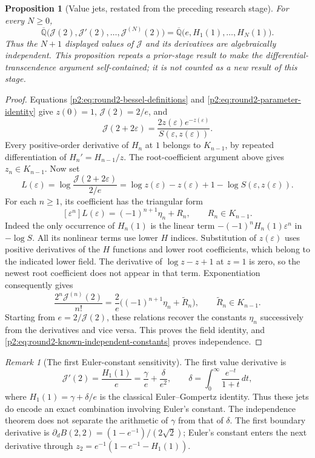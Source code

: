 \documentclass[11pt,a4paper]{article}
\newtheorem{proposition}[theorem]{Proposition}
\theoremstyle{definition}
\theoremstyle{remark}
\newtheorem{remark}[theorem]{Remark}
\numberwithin{equation}{section}
\begin{document}
\begin{proposition}[Value jets, restated from the preceding research stage]
\label{p2:prop:round2-value-jets}
For every $N\geq0$,
\[
 \overline{\mathbb Q}\bigl(\mathcal J(2),\mathcal J'(2),
                     \ldots,\mathcal J^{(N)}(2)\bigr)
 =\overline{\mathbb Q}\bigl(e,H_1(1),\ldots,H_N(1)\bigr).
\]
Thus the $N+1$ displayed values of $\mathcal J$ and its derivatives
are algebraically independent. This proposition repeats a prior-stage
result to make the differential-transcendence argument self-contained;
it is not counted as a new result of this stage.
\end{proposition}
\begin{proof}
Equations \eqref{p2:eq:round2-bessel-definitions} and
\eqref{p2:eq:round2-parameter-identity} give $z(0)=1$,
$\mathcal J(2)=2/e$, and
\[
 \mathcal J(2+2\varepsilon)
   =\frac{2z(\varepsilon)e^{-z(\varepsilon)}}
          {S(\varepsilon,z(\varepsilon))}.
\]
Every positive-order derivative of $H_n$ at $1$ belongs to
$K_{n-1}$, by repeated differentiation of $H_n'=H_{n-1}/z$.
The root-coefficient argument above gives $z_n\in K_{n-1}$.
Now set
\[
 L(\varepsilon)=\log\frac{\mathcal J(2+2\varepsilon)}{2/e}
 =\log z(\varepsilon)-z(\varepsilon)+1
       -\log S(\varepsilon,z(\varepsilon)).
\]
For each $n\geq1$, its coefficient has the triangular form
\[
 [\varepsilon^n]L(\varepsilon)=(-1)^{n+1}\eta_n+R_n,
 \qquad R_n\in K_{n-1}.
\]
Indeed the only occurrence of $H_n(1)$ is the linear term
$-(-1)^nH_n(1)\varepsilon^n$ in $-\log S$. All its nonlinear
terms use lower $H$ indices. Substitution of $z(\varepsilon)$ uses
positive derivatives of the $H$ functions and lower root coefficients,
which belong to the indicated lower field. The derivative of
$\log z-z+1$ at $z=1$ is zero, so the newest root coefficient
does not appear in that term. Exponentiation consequently gives
\[
 \frac{2^n\mathcal J^{(n)}(2)}{n!}
   =\frac2e\bigl((-1)^{n+1}\eta_n+\widetilde R_n\bigr),
 \qquad\widetilde R_n\in K_{n-1}.
\]
Starting from $e=2/\mathcal J(2)$, these relations recover the
constants $\eta_n$ successively from the derivatives and vice versa.
This proves the field identity, and
\eqref{p2:eq:round2-known-independent-constants} proves independence.
\end{proof}

\begin{remark}[The first Euler-constant sensitivity]
The first value derivative is
\[
 \mathcal J'(2)=\frac{H_1(1)}e
      =\frac\gamma e+\frac\delta{e^2},
 \qquad \delta=\int_0^\infty\frac{e^{-t}}{1+t}\,dt,
\]
where $H_1(1)=\gamma+\delta/e$ is the classical
Euler--Gompertz identity. Thus these jets do encode an exact
combination involving Euler's constant. The independence theorem
does not separate the arithmetic of $\gamma$ from that of $\delta$.
The first boundary derivative is
$\partial_dB(2,2)=(1-e^{-1})/(2\sqrt2)$; Euler's constant enters
the next derivative through
$z_2=e^{-1}(1-e^{-1}-H_1(1))$.
\end{remark}
\end{document}
